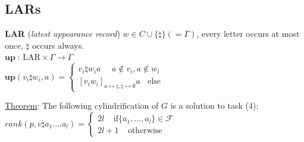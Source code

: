 \subsection*{LARs}
\textbf{LAR} (\textit{latest appearance record}) $w \in C \cup \{\natural\} (=\Gamma)$, every letter occurs at most once, $\natural$ occurs always.\\
$\textbf{up}\ :\ \text{LAR} \times \Gamma \rightarrow \Gamma$\\
$\textbf{up}(v_i \natural w_i, a) = \begin{cases}
	v_i \natural w_i a\ \ \ \ \ \ a \not\in v_i, a \not\in w_i\\
	[v_iw_i]_{a \mapsto \natural, \natural \mapsto \emptyset}a\ \ \ \ \text{else}
\end{cases}$

\noindent
\underline{Theorem}: The following cylindrification of $G$ is a solution to task (4):
$rank(p, v\natural a_1....a_l) = \begin{cases}
	2l\ \ \ \ \ \text{if} \{a_1,...,a_l\} \in \mathcal{F}\\
	2l + 1\ \ \ \ \ \text{otherwise}
\end{cases}$